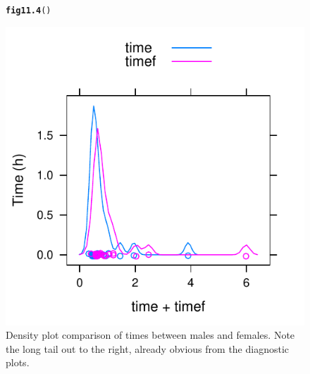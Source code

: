 \documentclass[12pt, a4paper,  BCOR=8.25mm, DIV=15]{scrartcl}\usepackage[]{graphicx}\usepackage[]{color}
\makeatletter
\def\maxwidth{ %
  \ifdim\Gin@nat@width>\linewidth
    \linewidth
  \else
    \Gin@nat@width
  \fi
}
\newcommand{\hlstd}[1]{\textcolor[rgb]{0.345,0.345,0.345}{#1}}%
\newcommand{\hlkwd}[1]{\textcolor[rgb]{0.737,0.353,0.396}{\textbf{#1}}}%
\newenvironment{kframe}{%
 \def\at@end@of@kframe{}%
 \ifinner\ifhmode%
  \def\at@end@of@kframe{\end{minipage}}%
  \begin{minipage}{\columnwidth}%
 \fi\fi%
 \def\FrameCommand##1{\hskip\@totalleftmargin \hskip-\fboxsep
 \colorbox{shadecolor}{##1}\hskip-\fboxsep
     \hskip-\linewidth \hskip-\@totalleftmargin \hskip\columnwidth}%
 \MakeFramed {\advance\hsize-\width
   \@totalleftmargin\z@ \linewidth\hsize
   \@setminipage}}%
 {\par\unskip\endMakeFramed%
 \at@end@of@kframe}
\newenvironment{knitrout}{}{} %
\makeatother
\begin{document}
\begin{figure}[H]
\begin{knitrout}
\color{fgcolor}\begin{kframe}
\begin{alltt}
\hlkwd{fig11.4}\hlstd{()}
\end{alltt}
\end{kframe}

{\centering \includegraphics[width=\maxwidth]{figs/reg-mfdensity-11_4-1} 

}



\end{knitrout}
  \caption{Density plot comparison of times between males
    and females.  Note the long tail out to the right,
  already obvious from the diagnostic plots.}\label{fig:skewtime}
\end{figure}
\end{document}
